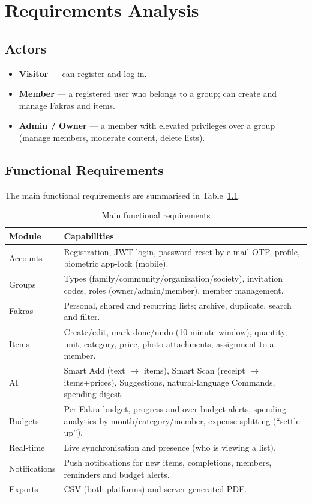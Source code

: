 \documentclass[12pt,a4paper,oneside]{report}
\begin{document}
\chapter{Requirements Analysis}\label{ch:analysis}
\section{Actors}
\begin{itemize}[leftmargin=1.4em]
  \item \textbf{Visitor} --- can register and log in.
  \item \textbf{Member} --- a registered user who belongs to a group; can create
        and manage Fakras and items.
  \item \textbf{Admin / Owner} --- a member with elevated privileges over a group
        (manage members, moderate content, delete lists).
\end{itemize}

\section{Functional Requirements}
The main functional requirements are summarised in Table~\ref{tab:func}.

\begin{table}[ht]\centering
\caption{Main functional requirements}\label{tab:func}
\begin{tabularx}{\linewidth}{@{}lX@{}}
\toprule
\textbf{Module} & \textbf{Capabilities}\\
\midrule
Accounts & Registration, JWT login, password reset by e-mail OTP, profile, biometric app-lock (mobile).\\
Groups & Types (family/community/organization/society), invitation codes, roles (owner/admin/member), member management.\\
Fakras & Personal, shared and recurring lists; archive, duplicate, search and filter.\\
Items & Create/edit, mark done/undo (10-minute window), quantity, unit, category, price, photo attachments, assignment to a member.\\
AI & Smart Add (text $\rightarrow$ items), Smart Scan (receipt $\rightarrow$ items+prices), Suggestions, natural-language Commands, spending digest.\\
Budgets & Per-Fakra budget, progress and over-budget alerts, spending analytics by month/category/member, expense splitting (``settle up'').\\
Real-time & Live synchronisation and presence (who is viewing a list).\\
Notifications & Push notifications for new items, completions, members, reminders and budget alerts.\\
Exports & CSV (both platforms) and server-generated PDF.\\
\bottomrule
\end{tabularx}
\end{table}
\end{document}
